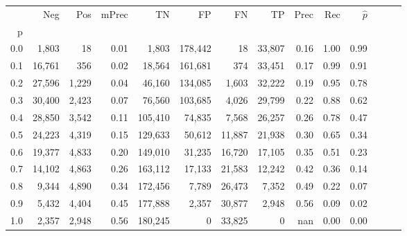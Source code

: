 \begin{tabular}{rrrrrrrrrrrrrr}
\toprule
{} &     Neg &    Pos & mPrec &       TN &       FP &      FN &      TP &  Prec &   Rec & $\hat{p}$ \\
p   &         &        &       &          &          &         &         &       &       &           \\
\midrule
0.0 &   1,803 &     18 &  0.01 &    1,803 &  178,442 &      18 &  33,807 &  0.16 &  1.00 &      0.99 \\
0.1 &  16,761 &    356 &  0.02 &   18,564 &  161,681 &     374 &  33,451 &  0.17 &  0.99 &      0.91 \\
0.2 &  27,596 &  1,229 &  0.04 &   46,160 &  134,085 &   1,603 &  32,222 &  0.19 &  0.95 &      0.78 \\
0.3 &  30,400 &  2,423 &  0.07 &   76,560 &  103,685 &   4,026 &  29,799 &  0.22 &  0.88 &      0.62 \\
0.4 &  28,850 &  3,542 &  0.11 &  105,410 &   74,835 &   7,568 &  26,257 &  0.26 &  0.78 &      0.47 \\
0.5 &  24,223 &  4,319 &  0.15 &  129,633 &   50,612 &  11,887 &  21,938 &  0.30 &  0.65 &      0.34 \\
0.6 &  19,377 &  4,833 &  0.20 &  149,010 &   31,235 &  16,720 &  17,105 &  0.35 &  0.51 &      0.23 \\
0.7 &  14,102 &  4,863 &  0.26 &  163,112 &   17,133 &  21,583 &  12,242 &  0.42 &  0.36 &      0.14 \\
0.8 &   9,344 &  4,890 &  0.34 &  172,456 &    7,789 &  26,473 &   7,352 &  0.49 &  0.22 &      0.07 \\
0.9 &   5,432 &  4,404 &  0.45 &  177,888 &    2,357 &  30,877 &   2,948 &  0.56 &  0.09 &      0.02 \\
1.0 &   2,357 &  2,948 &  0.56 &  180,245 &        0 &  33,825 &       0 &   nan &  0.00 &      0.00 \\
\bottomrule
\end{tabular}
